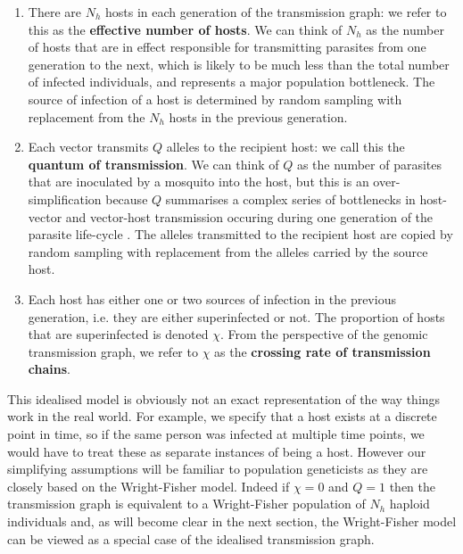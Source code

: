 \documentclass[_main.tex]{subfiles}
\begin{document}
\begin{enumerate}

\item  There are $N_h$ hosts in each generation of the transmission graph: we refer to this as the \textbf{effective number of hosts}.  We can think of $N_h$ as the number of hosts that are in effect responsible for transmitting parasites from one generation to the next, which is likely to be much less than the total number of infected individuals, and represents a major population bottleneck.  The source of infection of a host is determined by random sampling with replacement from the $N_h$ hosts in the previous generation.

\item Each vector transmits $Q$ alleles to the recipient host: we call this the \textbf{quantum of transmission}.  We can think of $Q$ as the number of parasites that are inoculated by a mosquito into the host, but this is an over-simplification because $Q$ summarises a complex series of bottlenecks in host-vector and vector-host transmission occuring during one generation of the parasite life-cycle \cite{Chan2013,Graumans2020}.  The alleles transmitted to the recipient host are copied by random sampling with replacement from the alleles carried by the source host.

\item Each host has either one or two sources of infection in the previous generation, i.e. they are either superinfected or not.  The proportion of hosts that are superinfected is denoted $\chi$.  From the perspective of the genomic transmission graph, we refer to $\chi$ as the \textbf{crossing rate of transmission chains}. 

\end{enumerate}

This idealised model is obviously not an exact representation of the way things work in the real world.  For example, we specify that a host exists at a discrete point in time, so if the same person was infected at multiple time points, we would have to treat these as separate instances of being a host.  However our simplifying assumptions will be familiar to population geneticists as they are closely based on the Wright-Fisher model.  Indeed if $\chi=0$ and $Q = 1$ then the transmission graph is equivalent to a Wright-Fisher population of $N_h$ haploid individuals and, as will become clear in the next section, the Wright-Fisher model can be viewed as a special case of the idealised transmission graph.
\end{document}
